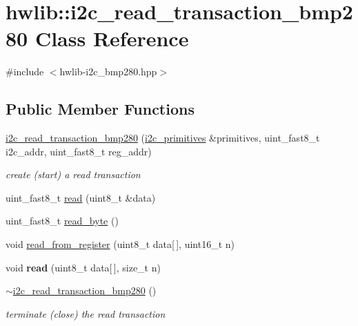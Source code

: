 \hypertarget{classhwlib_1_1i2c__read__transaction__bmp280}{}\section{hwlib\+::i2c\+\_\+read\+\_\+transaction\+\_\+bmp280 Class Reference}
\label{classhwlib_1_1i2c__read__transaction__bmp280}


{\ttfamily \#include $<$hwlib-\/i2c\+\_\+bmp280.\+hpp$>$}

\subsection*{Public Member Functions}
\begin{DoxyCompactItemize}
\item 
\mbox{\label{classhwlib_1_1i2c__read__transaction__bmp280_a3fd67094af4d16fe409a69db5b5514c6}} 
\mbox{\hyperlink{classhwlib_1_1i2c__read__transaction__bmp280_a3fd67094af4d16fe409a69db5b5514c6}{i2c\+\_\+read\+\_\+transaction\+\_\+bmp280}} (\mbox{\hyperlink{classhwlib_1_1i2c__primitives}{i2c\+\_\+primitives}} \&primitives, uint\+\_\+fast8\+\_\+t i2c\+\_\+addr, uint\+\_\+fast8\+\_\+t reg\+\_\+addr)
\begin{DoxyCompactList}\small\item\em create (start) a read transaction \end{DoxyCompactList}\item 
uint\+\_\+fast8\+\_\+t \mbox{\hyperlink{classhwlib_1_1i2c__read__transaction__bmp280_a96d6bcfad832c1fa278305cd59d8756e}{read}} (uint8\+\_\+t \&data)
\item 
uint\+\_\+fast8\+\_\+t \mbox{\hyperlink{classhwlib_1_1i2c__read__transaction__bmp280_ae928d38fa75a357dee92717b3888e2e5}{read\+\_\+byte}} ()
\item 
void \mbox{\hyperlink{classhwlib_1_1i2c__read__transaction__bmp280_a1105511aec269220328b3b64bf72521a}{read\+\_\+from\+\_\+register}} (uint8\+\_\+t data\mbox{[}$\,$\mbox{]}, uint16\+\_\+t n)
\item 
\mbox{\label{classhwlib_1_1i2c__read__transaction__bmp280_a8aa882ce79b24083764d17badcc193dc}} 
void {\bfseries read} (uint8\+\_\+t data\mbox{[}$\,$\mbox{]}, size\+\_\+t n)
\item 
\mbox{\label{classhwlib_1_1i2c__read__transaction__bmp280_a7059b62573a67086b570140c3683d9a0}} 
\mbox{\hyperlink{classhwlib_1_1i2c__read__transaction__bmp280_a7059b62573a67086b570140c3683d9a0}{$\sim$i2c\+\_\+read\+\_\+transaction\+\_\+bmp280}} ()
\begin{DoxyCompactList}\small\item\em terminate (close) the read transaction \end{DoxyCompactList}\end{DoxyCompactItemize}


